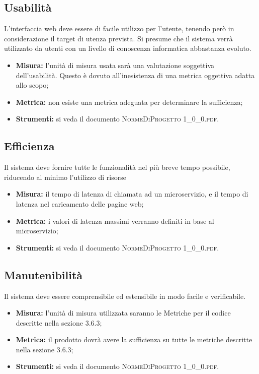 	\subsection{Usabilità}
		L’interfaccia web deve essere di facile utilizzo per l’utente, tenendo però in considerazione il target di utenza prevista. Si presume che il sistema verrà utilizzato da utenti con un livello di conoscenza informatica abbastanza evoluto. 
		
		\begin{itemize}
			\item \textbf{Misura: }l’unità di misura usata sarà una valutazione soggettiva dell’usabilità. Questo
			è dovuto all’inesistenza di una metrica oggettiva adatta allo scopo;
			\item \textbf{Metrica: }non esiste una metrica adeguata per determinare la sufficienza;
			\item \textbf{Strumenti: }si veda il documento \textsc{NormeDiProgetto 1\_0\_0.pdf}.
			
		\end{itemize}
	
	\subsection{Efficienza}
		Il sistema deve fornire tutte le funzionalità nel più breve tempo possibile, riducendo al minimo l’utilizzo di risorse
		
		\begin{itemize}
			\item \textbf{Misura: }il tempo di latenza di chiamata ad un microservizio, e il tempo di latenza nel caricamento delle pagine web;
			\item \textbf{Metrica: }i valori di latenza massimi verranno definiti in base al microservizio;
			\item \textbf{Strumenti: }si veda il documento \textsc{NormeDiProgetto 1\_0\_0.pdf}.
			
		\end{itemize}
	
	\subsection{Manutenibilità}
		Il sistema deve essere comprensibile ed estensibile in modo facile e verificabile.
		
		\begin{itemize}
			\item \textbf{Misura: }l’unità di misura utilizzata saranno le Metriche per il codice descritte nella sezione 3.6.3;
			\item \textbf{Metrica: }il prodotto dovrà avere la sufficienza su tutte le metriche descritte nella sezione 3.6.3;
			\item \textbf{Strumenti: }si veda il documento \textsc{NormeDiProgetto 1\_0\_0.pdf}.
			
		\end{itemize}
	
